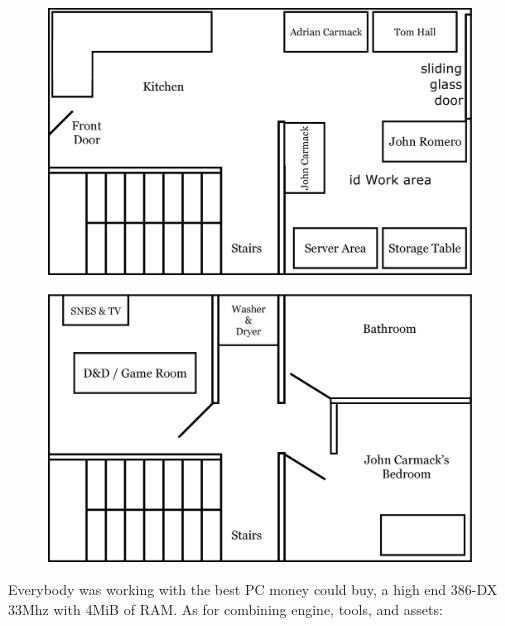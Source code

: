 \documentclass[book.tex]{subfiles}
\begin{document}
\par
\begin{figure}[H]
  \centering
  \includegraphics[width=\textwidth]{imgs/drawings/map/id-software-office-madison_bottom_floor.eps}
\end{figure}
\par
\begin{figure}[H]
  \centering
  \includegraphics[width=\textwidth]{imgs/drawings/map/id-software-office-madison_top_floor.eps}
\end{figure}
Everybody was working with the best PC money could buy, a high end 386-DX 33Mhz with 4MiB of RAM. As for combining engine, tools, and assets:\\
\end{document}
